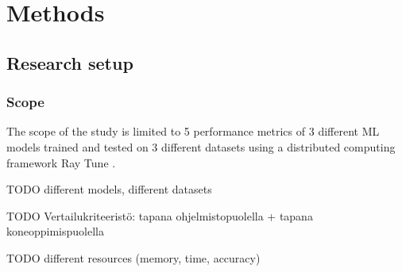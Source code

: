 \chapter{Methods}
\label{chap:methods}

\section{Research setup}
\subsection{Scope}
The scope of the study is limited to 5 performance metrics of 3 different ML models trained and tested on 3 different datasets using a distributed computing framework Ray Tune \parencite{liawTuneResearchPlatform2018}.

TODO different models, different datasets

TODO Vertailukriteeristö: tapana ohjelmistopuolella + tapana koneoppimispuolella

TODO different resources (memory, time, accuracy)



